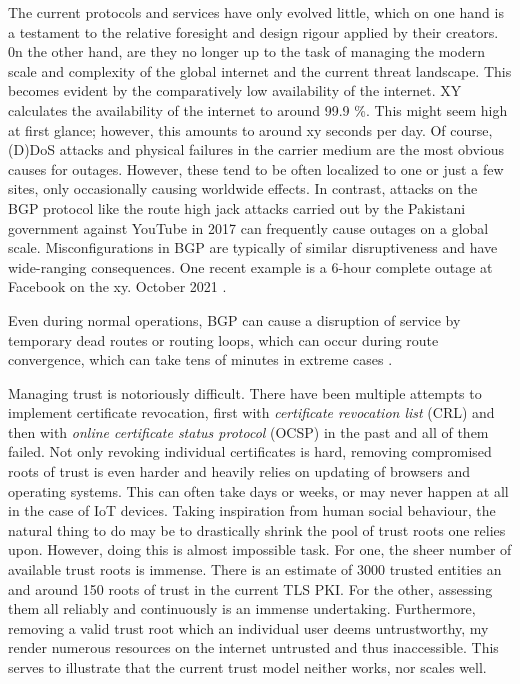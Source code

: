 \documentclass[../eva1_scion.tex]{subfiles}
\begin{document}
    The current protocols and services have only evolved little, which on one hand is a testament to the relative foresight and design rigour applied by their creators. 0n the other hand, are they no longer up to the task of managing the modern scale and complexity of the global internet and the current threat landscape. This becomes evident by the comparatively low availability of the internet. XY calculates the availability of the internet to around 99.9 \%. This might seem high at first glance; however, this amounts to around xy seconds per day. Of course, (D)DoS attacks and physical failures in the carrier medium are the most obvious causes for outages. However, these tend to be often localized to one or just a few sites, only occasionally causing worldwide effects. In contrast, attacks on the BGP protocol like the route high jack attacks carried out by the Pakistani government against YouTube in 2017 \cite{youtbe_highjack} can frequently cause outages on a global scale. Misconfigurations in BGP are typically of similar disruptiveness and have wide-ranging consequences. One recent example is a 6-hour complete outage at Facebook on the xy. October 2021 \cite{facebook_oups}.

    Even during normal operations, BGP can cause a disruption of service by temporary dead routes or routing loops, which can occur during route convergence, which can take tens of minutes in extreme cases \cite{route_convergence}.

    Managing trust is notoriously difficult. There have been multiple attempts to implement certificate revocation, first with \textit{certificate revocation list} (CRL) \cite{rfc_crl} and then with \textit{online certificate status protocol} (OCSP) \cite{rfc_opsc} in the past and all of them failed. Not only revoking individual certificates is hard, removing compromised roots of trust is even harder and heavily relies on updating of browsers and operating systems. This can often take days or weeks, or may never happen at all in the case of IoT devices. Taking inspiration from human social behaviour, the natural thing to do may be to  drastically shrink the pool of trust roots one relies upon. However, doing this is almost impossible task. For one, the sheer number of available trust roots is immense. There is an estimate of 3000 \cite{trusted_entities} trusted entities an and around 150 roots of trust in the current TLS PKI. For the other, assessing them all reliably and continuously is an immense undertaking. Furthermore, removing a valid trust root which an individual user deems untrustworthy, my render numerous resources on the internet untrusted and thus inaccessible. This serves to illustrate that the current trust model neither works, nor  scales well.
\end{document}
